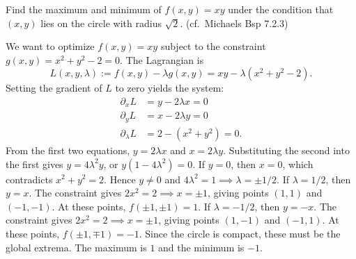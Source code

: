 \begin{center}
\end{center}

\begin{example}
\label{ex:extrema_on_circle}
Find the maximum and minimum of $f(x,y) = xy$ under the condition that $(x,y)$ lies on the circle with radius $\sqrt{2}$. (cf.\ Michaels Bsp 7.2.3)

\medskip
We want to optimize $f(x,y) = xy$ subject to the constraint $g(x,y) = x^2+y^2-2 = 0$.
The Lagrangian is
\[L(x,y,\lambda) := f(x,y) - \lambda g(x,y) = xy - \lambda(x^2+y^2-2).\]
Setting the gradient of $L$ to zero yields the system:
\begin{align*}
  \partial_x L &= y - 2\lambda x = 0 \\
  \partial_y L &= x - 2\lambda y = 0 \\
  \partial_\lambda L &= 2 - (x^2+y^2) = 0.
\end{align*}
From the first two equations, $y = 2\lambda x$ and $x = 2\lambda y$. Substituting the second into the first gives $y = 4\lambda^2 y$, or $y(1-4\lambda^2) = 0$.
If $y=0$, then $x=0$, which contradicts $x^2+y^2=2$. Hence $y \neq 0$ and $4\lambda^2 = 1 \implies \lambda = \pm 1/2$.
If $\lambda = 1/2$, then $y = x$. The constraint gives $2x^2 = 2 \implies x = \pm 1$, giving points $(1,1)$ and $(-1,-1)$. At these points, $f(\pm 1, \pm 1) = 1$.
If $\lambda = -1/2$, then $y = -x$. The constraint gives $2x^2 = 2 \implies x = \pm 1$, giving points $(1,-1)$ and $(-1,1)$. At these points, $f(\pm 1, \mp 1) = -1$.
Since the circle is compact, these must be the global extrema. The maximum is $1$ and the minimum is $-1$.
\end{example}

